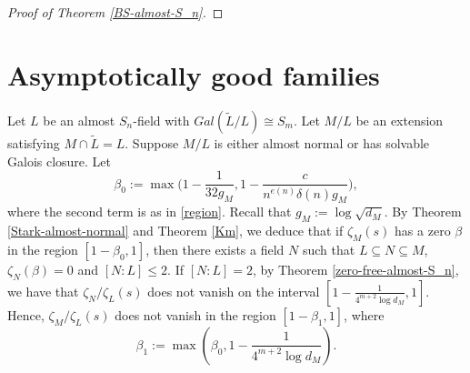 \documentclass[12pt]{amsart}
\theoremstyle{definition}
\newcommand{\Q}{\mathbb{Q}}
\begin{document}
\begin{proof}[Proof of Theorem \ref{BS-almost-S_n}]




    
\end{proof}

\bigskip

\section{Asymptotically good families}
\bigskip

% 



Let $L$ be an almost $S_n$-field with $Gal(\widetilde{L}/L)\cong S_m$. Let $M/L$ be an extension satisfying $M\cap \widetilde{L}=L$. Suppose $M/L$ is either almost normal or has solvable Galois closure. Let
\begin{equation*}
    \beta_0 := \max\bigg(1-\frac{1}{32 g_M}, 1 - \frac{c}{n^{e(n)} \delta(n) g_M} \bigg),
\end{equation*}
where the second term is as in \eqref{region}. Recall that $g_M:=\log \sqrt{d_M}$. By Theorem \ref{Stark-almost-normal} and Theorem \ref{Km}, we deduce that if $\zeta_M(s)$ has a zero $\beta$ in the region $[1-\beta_0, 1]$, then there exists a field $N$ such that $L\subseteq N\subseteq M$, $\zeta_N(\beta)=0$ and $[N:L]\leq 2$. If $[N:L]=2$, by Theorem \ref{zero-free-almost-S_n}, we have that $\zeta_N/\zeta_L(s)$ does not vanish on the interval $[1-\frac{1}{4^{m+2} \log d_M}, 1]$. Hence, $\zeta_M/\zeta_L(s)$ does not vanish in the region $[1-\beta_1, 1]$, where
$$
    \beta_1 := \max\left(\beta_0, 1 - \frac{1}{4^{m+2} \log d_M}\right).
$$
\end{document}
